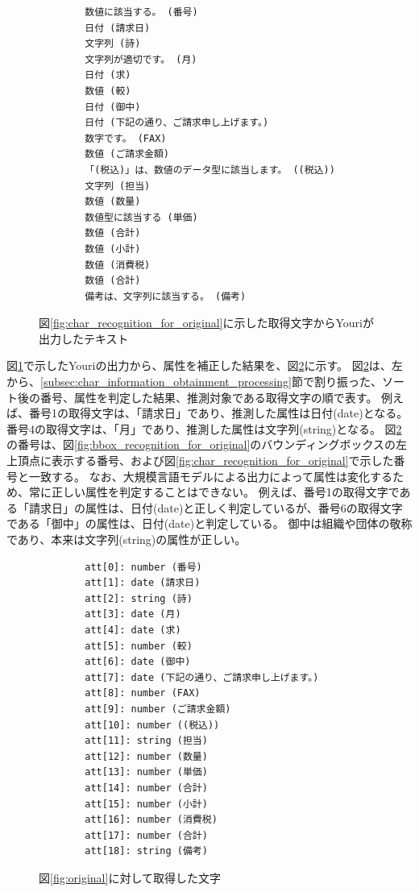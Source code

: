 \lstset{language=}
\begin{figure}[t]
    \begin{lstlisting}
        数値に該当する。 (番号)
        日付 (請求日)
        文字列 (詩)
        文字列が適切です。 (月)
        日付 (求)
        数値 (較)
        日付 (御中)
        日付 (下記の通り、ご請求申し上げます。)
        数字です。 (FAX)
        数値 (ご請求金額)
        「(税込)」は、数値のデータ型に該当します。 ((税込))
        文字列 (担当)
        数値 (数量)
        数値型に該当する (単価)
        数値 (合計)
        数値 (小計)
        数値 (消費税)
        数値 (合計)
        備考は、文字列に該当する。 (備考)
    \end{lstlisting}
    \caption{図\ref{fig:char_recognition_for_original}に示した取得文字からYouriが出力したテキスト}
    \label{fig:output_Youri}
\end{figure}

図\ref{fig:output_Youri}で示したYouriの出力から、属性を補正した結果を、図\ref{fig:predict_att_for_original}に示す。
図\ref{fig:predict_att_for_original}は、左から、\ref{subsec:char_information_obtainment_processing}節で割り振った、ソート後の番号、属性を判定した結果、推測対象である取得文字の順で表す。
例えば、番号1の取得文字は、「請求日」であり、推測した属性は日付(date)となる。番号4の取得文字は、「月」であり、推測した属性は文字列(string)となる。
図\ref{fig:predict_att_for_original}の番号は、図\ref{fig:bbox_recognition_for_original}のバウンディングボックスの左上頂点に表示する番号、および図\ref{fig:char_recognition_for_original}で示した番号と一致する。
なお、大規模言語モデルによる出力によって属性は変化するため、常に正しい属性を判定することはできない。
例えば、番号1の取得文字である「請求日」の属性は、日付(date)と正しく判定しているが、番号6の取得文字である「御中」の属性は、日付(date)と判定している。
御中は組織や団体の敬称であり、本来は文字列(string)の属性が正しい。

\lstset{language=}
\begin{figure}[t]
    \begin{lstlisting}
        att[0]: number (番号)
        att[1]: date (請求日)
        att[2]: string (詩)
        att[3]: date (月)
        att[4]: date (求)
        att[5]: number (較)
        att[6]: date (御中)
        att[7]: date (下記の通り、ご請求申し上げます。)
        att[8]: number (FAX)
        att[9]: number (ご請求金額)
        att[10]: number ((税込))
        att[11]: string (担当)
        att[12]: number (数量)
        att[13]: number (単価)
        att[14]: number (合計)
        att[15]: number (小計)
        att[16]: number (消費税)
        att[17]: number (合計)
        att[18]: string (備考)
    \end{lstlisting}
    \caption{図\ref{fig:original}に対して取得した文字}
    \label{fig:predict_att_for_original}
\end{figure}

